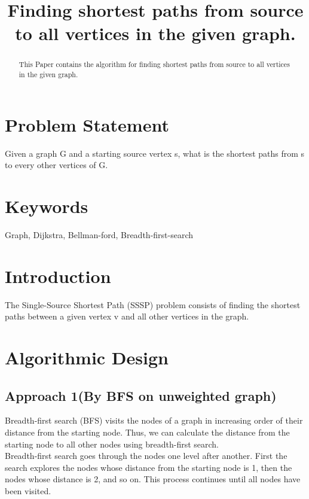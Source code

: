 \documentclass[conference]{IEEEtran}
\begin{document}
\title{Finding shortest paths from source to all vertices in the given graph.\\
}
\author{
\and
{}
\and
{}
}

\maketitle

\begin{abstract}
This Paper contains the algorithm for finding shortest paths from source to all vertices in the given graph.
\end{abstract}

\section{Problem Statement}
Given a graph G and a starting source vertex s, what is the shortest paths from s to every other vertices of G.
\section{Keywords}
Graph, Dijkstra, Bellman-ford, Breadth-first-search

\section{Introduction}
The Single-Source Shortest Path (SSSP) problem consists of finding the shortest paths between a given vertex v and all other vertices in the graph.
\section{Algorithmic Design}

\subsection{ \textbf{Approach 1(By BFS on unweighted graph)}}
Breadth-first search (BFS) visits the nodes of a graph in increasing order of their distance from the starting node. Thus, we can calculate the distance from the starting node to all other nodes using breadth-first search.\\
Breadth-first search goes through the nodes one level after another. First the search explores the nodes whose distance from the starting node is 1, then the nodes whose distance is 2, and so on. This process continues until all nodes have been visited.
\end{document}
